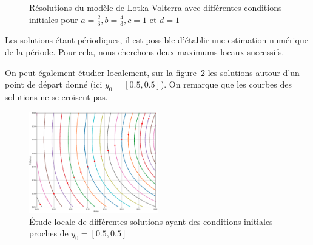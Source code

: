 \begin{figure}[ht]
	\centering
	\caption{Résolutions du modèle de Lotka-Volterra avec différentes conditions initiales pour $a = \frac{2}{3}, b = \frac{4}{3}, c = 1 \text{ et } d =1$}
	\label{fig:lv}
\end{figure}

Les solutions étant périodiques, il est possible d'établir une estimation numérique de la période. Pour cela, nous cherchons deux maximums locaux successifs.
\vskip 1mm ~

On peut également étudier localement, sur la figure~\ref{fig:loc} les solutions autour d'un point de départ donné (ici $y_0 = [0.5,0.5]$). On remarque que les courbes des solutions ne se croisent pas.
\vskip 1mm ~

\begin{figure}[H]
	\centering
	\includegraphics[width=0.5\textwidth]{img/loc}
	\caption{Étude locale de différentes solutions ayant des conditions initiales proches de $y_0 = [0.5,0.5]$}
	\label{fig:loc}
\end{figure}

